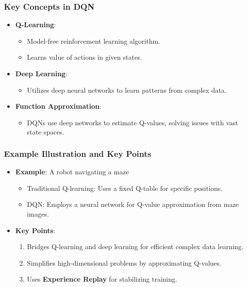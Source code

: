 \documentclass{beamer}
\begin{document}
\begin{frame}[fragile]
    \frametitle{Key Concepts in DQN}
    \begin{itemize}
        \item \textbf{Q-Learning}: 
        \begin{itemize}
            \item Model-free reinforcement learning algorithm.
            \item Learns value of actions in given states.
        \end{itemize}
        
        \item \textbf{Deep Learning}:
        \begin{itemize}
            \item Utilizes deep neural networks to learn patterns from complex data.
        \end{itemize}
        
        \item \textbf{Function Approximation}:
        \begin{itemize}
            \item DQNs use deep networks to estimate Q-values, solving issues with vast state spaces.
        \end{itemize}
    \end{itemize}
\end{frame}

\begin{frame}[fragile]
    \frametitle{Example Illustration and Key Points}
    \begin{itemize}
        \item \textbf{Example}: A robot navigating a maze
        \begin{itemize}
            \item Traditional Q-learning: Uses a fixed Q-table for specific positions.
            \item DQN: Employs a neural network for Q-value approximation from maze images.
        \end{itemize}
        
        \item \textbf{Key Points}:
        \begin{enumerate}
            \item Bridges Q-learning and deep learning for efficient complex data learning.
            \item Simplifies high-dimensional problems by approximating Q-values.
            \item Uses \textbf{Experience Replay} for stabilizing training.
        \end{enumerate}
    \end{itemize}
\end{frame}
\end{document}
